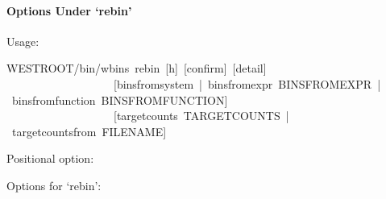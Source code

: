 \documentclass[letterpaper,10pt,english]{sphinxmanual}
\begin{document}
\begin{sphinxVerbatim}[commandchars=\\\{\}]
           
      
\end{sphinxVerbatim}


\paragraph{Options Under ‘rebin’}
\label{\detokenize{users_guide/command_line_tools/w_bins:options-under-rebin}}
Usage:

\begin{sphinxVerbatim}[commandchars=\\\{\}]
\PYGZdl{}WEST\PYGZus{}ROOT/bin/w\PYGZus{}bins rebin [\PYGZhy{}h] [\PYGZhy{}\PYGZhy{}confirm] [\PYGZhy{}\PYGZhy{}detail]
                   [\PYGZhy{}\PYGZhy{}bins\PYGZhy{}from\PYGZhy{}system | \PYGZhy{}\PYGZhy{}bins\PYGZhy{}from\PYGZhy{}expr BINS\PYGZus{}FROM\PYGZus{}EXPR | \PYGZhy{}\PYGZhy{}bins\PYGZhy{}from\PYGZhy{}function BINS\PYGZus{}FROM\PYGZus{}FUNCTION]
                   [\PYGZhy{}\PYGZhy{}target\PYGZhy{}counts TARGET\PYGZus{}COUNTS | \PYGZhy{}\PYGZhy{}target\PYGZhy{}counts\PYGZhy{}from FILENAME]
\end{sphinxVerbatim}

Positional option:

\begin{sphinxVerbatim}[commandchars=\\\{\}]
       
\end{sphinxVerbatim}

Options for ‘rebin’:

\begin{sphinxVerbatim}[commandchars=\\\{\}]
           
           

         
\end{sphinxVerbatim}
\end{document}

